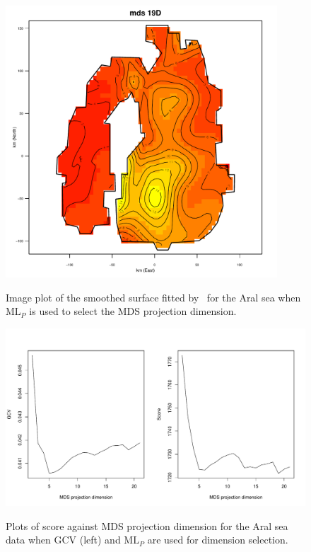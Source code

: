 \begin{figure}
\centering
\includegraphics[width=4in]{gds/figs/aral-19d.pdf} \\
\caption{Image plot of the smoothed surface fitted by \mdsds\ for the Aral sea when $\text{ML}_P$ is used to select the MDS projection dimension.}
\label{gds-aral-19d}
\end{figure}

\begin{figure}
\centering
\includegraphics[width=6in]{gds/figs/aral-dim-scores.pdf} \\
\caption{Plots of score against MDS projection dimension for the Aral sea data when GCV (left) and $\text{ML}_P$ are used for dimension selection.}
\label{gds-aral-dim-select}
\end{figure}

